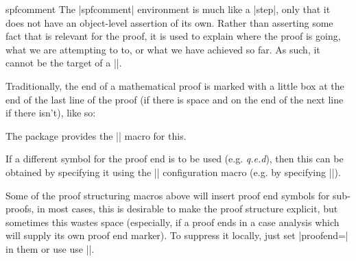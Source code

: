 \begin{environment}{spfcomment}
  The |spfcomment| environment is much like a |step|, only that it does not have an
  object-level assertion of its own. Rather than asserting some fact that is relevant
  for the proof, it is used to explain where the proof is going, what we are attempting
  to to, or what we have achieved so far. As such, it cannot be the target of a
  |\premise|.
\end{environment}

\begin{function}{\sproofend}
  Traditionally, the end of a mathematical proof is marked with a little box at the end of
  the last line of the proof (if there is space and on the end of the next line if there
  isn't), like so:\sproofend

  The  package provides the |\sproofend| macro for this.
\end{function}
  
\begin{variable}{\sProofEndSymbol}
  If a different symbol for the proof end is to be used (e.g. {\sl{q.e.d}}), then this can
  be obtained by specifying it using the |\sProofEndSymbol| configuration macro (e.g. by
  specifying ||).
\end{variable}
  
Some of the proof structuring macros above will insert proof end symbols for sub-proofs,
in most cases, this is desirable to make the proof structure explicit, but sometimes this
wastes space (especially, if a proof ends in a case analysis which will supply its own
proof end marker). To suppress it locally, just set |proofend={}| in them or use use
|\sProofEndSymbol{}|.


